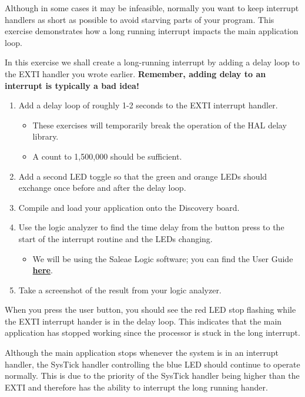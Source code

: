 \documentclass[openany,11pt,fleqn]{book} %
\begin{document}
\begin{exercise}
    \label{ex6}
   Although in some cases it may be infeasible, normally you want to keep interrupt handlers as short as possible to avoid starving parts of your program. This exercise demonstrates how a long running interrupt impacts the main application loop. 

   In this exercise we shall create a long-running interrupt by adding a delay loop to the EXTI handler you wrote earlier. \textbf{Remember, adding delay to an interrupt is typically a bad idea!} 
   \begin{enumerate}
       \item Add a delay loop of roughly 1-2 seconds to the EXTI interrupt handler.
       \begin{itemize}
           \item These exercises will temporarily break the operation of the HAL delay library.
           \item A count to 1,500,000 should be sufficient. 
       \end{itemize} 
       \item Add a second LED toggle so that the green and orange LEDs should exchange once before and after the delay loop. 
       \item Compile and load your application onto the Discovery board.
       \item Use the logic analyzer to find the time delay from the button press to the start of the interrupt routine and the LEDs changing.
       \begin{itemize}
       	\item We will be using the Saleae Logic software; you can find the User Guide  \href{http://downloads.saleae.com/Logic+Guide.pdf}{\textbf{here}}.
       	
       \end{itemize}
       \item Take a screenshot of the result from your logic analyzer.
   \end{enumerate}
   
    \noindent When you press the user button, you should see the red LED stop flashing while the EXTI interrupt hander is in the delay loop. This indicates that the main application has stopped working since the processor is stuck in the long interrupt. 
    
   Although the main application stops whenever the system is in an interrupt handler, the SysTick handler controlling the blue LED should continue to operate normally. This is due to the priority of the SysTick handler being higher than the EXTI and therefore has the ability to interrupt the long running hander.
\end{exercise}
  
\end{document}
